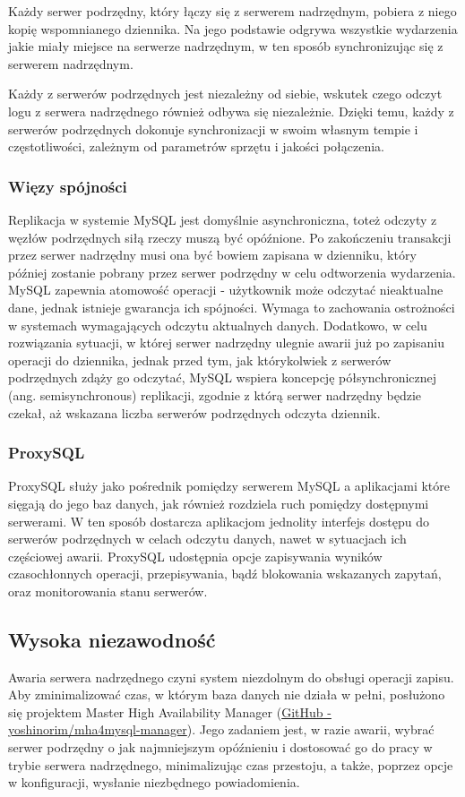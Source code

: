 \documentclass[11pt,a4paper,twoside]{article}
\begin{document}
Każdy serwer podrzędny, który łączy się z serwerem nadrzędnym, pobiera z niego kopię wspomnianego dziennika. Na jego podstawie odgrywa wszystkie wydarzenia jakie miały miejsce na  serwerze nadrzędnym, w ten sposób synchronizując się z serwerem nadrzędnym.

Każdy z serwerów podrzędnych jest niezależny od siebie, wskutek czego odczyt logu z serwera nadrzędnego również odbywa się niezależnie. Dzięki temu, każdy z serwerów podrzędnych dokonuje synchronizacji w swoim własnym tempie i częstotliwości, zależnym od parametrów sprzętu i jakości połączenia.

\subsubsection{Więzy spójności}
Replikacja w systemie MySQL jest domyślnie asynchroniczna, toteż odczyty z węzłów podrzędnych siłą rzeczy muszą być opóźnione. Po zakończeniu transakcji przez serwer nadrzędny musi ona być bowiem zapisana w dzienniku, który później zostanie pobrany przez serwer podrzędny w celu odtworzenia wydarzenia. MySQL zapewnia atomowość operacji - użytkownik może odczytać nieaktualne dane, jednak istnieje gwarancja ich spójności. Wymaga to zachowania ostrożności w systemach wymagających odczytu aktualnych danych. Dodatkowo, w celu rozwiązania sytuacji, w której serwer nadrzędny ulegnie awarii już po zapisaniu operacji do dziennika, jednak przed tym, jak którykolwiek z serwerów podrzędnych zdąży go odczytać, MySQL wspiera koncepcję półsynchronicznej (ang. semisynchronous) replikacji, zgodnie z którą serwer nadrzędny będzie czekał, aż wskazana liczba serwerów podrzędnych odczyta dziennik.

\subsubsection{ProxySQL}
ProxySQL służy jako pośrednik pomiędzy serwerem MySQL a aplikacjami które sięgają do jego baz danych, jak również rozdziela ruch pomiędzy dostępnymi serwerami. W ten sposób dostarcza aplikacjom jednolity interfejs dostępu do serwerów podrzędnych w celach odczytu danych, nawet w sytuacjach ich częściowej awarii. ProxySQL udostępnia opcje zapisywania wyników czasochłonnych operacji, przepisywania, bądź blokowania wskazanych zapytań, oraz monitorowania stanu serwerów.

\subsection{Wysoka niezawodność}
Awaria serwera nadrzędnego czyni system niezdolnym do obsługi operacji zapisu. Aby zminimalizować czas, w którym baza danych nie działa w pełni, posłużono się projektem Master High Availability Manager (\href{https://github.com/yoshinorim/mha4mysql-manager}{GitHub - yoshinorim/mha4mysql-manager}). Jego zadaniem jest, w razie awarii, wybrać serwer podrzędny o jak najmniejszym opóźnieniu i dostosować go do pracy w trybie serwera nadrzędnego, minimalizując czas przestoju, a także, poprzez opcje w konfiguracji, wysłanie niezbędnego powiadomienia.
\end{document}
